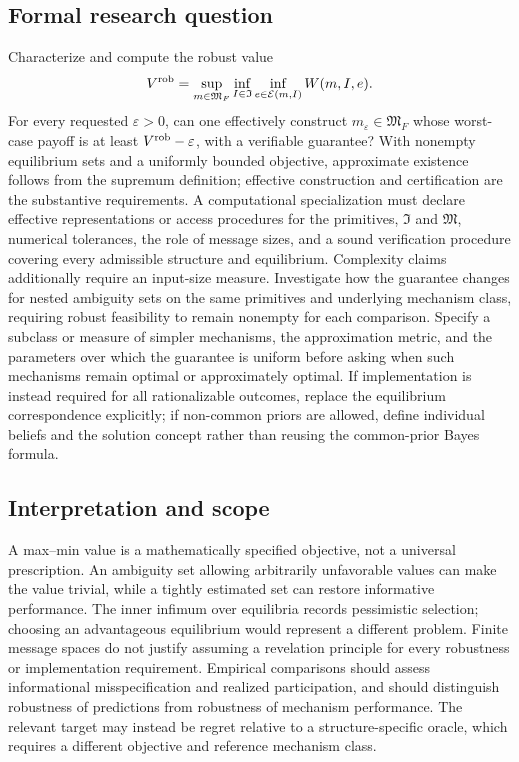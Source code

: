 \documentclass[11pt,a4paper]{article}
\begin{document}
\subsection*{Formal research question}

Characterize and compute the robust value
\[
V^{\rm rob}=\sup_{m\in\mathfrak M_F}\inf_{I\in\mathfrak I}\inf_{e\in\mathcal E(m,I)}W(m,I,e).
\]
For every requested $\varepsilon>0$, can one effectively construct $m_\varepsilon\in\mathfrak M_F$ whose worst-case payoff is at least $V^{\rm rob}-\varepsilon$, with a verifiable guarantee? With nonempty equilibrium sets and a uniformly bounded objective, approximate existence follows from the supremum definition; effective construction and certification are the substantive requirements. A computational specialization must declare effective representations or access procedures for the primitives, $\mathfrak I$ and $\mathfrak M$, numerical tolerances, the role of message sizes, and a sound verification procedure covering every admissible structure and equilibrium. Complexity claims additionally require an input-size measure. Investigate how the guarantee changes for nested ambiguity sets on the same primitives and underlying mechanism class, requiring robust feasibility to remain nonempty for each comparison. Specify a subclass or measure of simpler mechanisms, the approximation metric, and the parameters over which the guarantee is uniform before asking when such mechanisms remain optimal or approximately optimal. If implementation is instead required for all rationalizable outcomes, replace the equilibrium correspondence explicitly; if non-common priors are allowed, define individual beliefs and the solution concept rather than reusing the common-prior Bayes formula.

\subsection*{Interpretation and scope}

A max--min value is a mathematically specified objective, not a universal prescription. An ambiguity set allowing arbitrarily unfavorable values can make the value trivial, while a tightly estimated set can restore informative performance. The inner infimum over equilibria records pessimistic selection; choosing an advantageous equilibrium would represent a different problem. Finite message spaces do not justify assuming a revelation principle for every robustness or implementation requirement. Empirical comparisons should assess informational misspecification and realized participation, and should distinguish robustness of predictions from robustness of mechanism performance. The relevant target may instead be regret relative to a structure-specific oracle, which requires a different objective and reference mechanism class.
\end{document}
